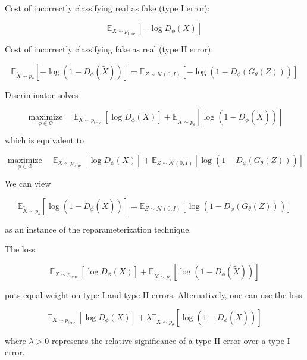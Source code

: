\begin{concept}
    Cost of incorrectly classifying real as fake (type I error):

    $$
    \mathbb{E}_{X \sim p_{\text {true }}}\left[-\log D_{\phi}(X)\right]
    $$

    Cost of incorrectly classifying fake as real (type II error):

    $$
    \mathbb{E}_{\tilde{X} \sim p_{\theta}}\left[-\log \left(1-D_{\phi}(\tilde{X})\right)\right]=\mathbb{E}_{Z \sim \mathcal{N}(0, I)}\left[-\log \left(1-D_{\phi}\left(G_{\theta}(Z)\right)\right)\right]
    $$

    \par\noindent\textcolor{gray}{\hdashrule{\textwidth}{0.4pt}{1pt 2pt}}

    Discriminator solves

    $$
    \underset{\phi \in \Phi}{\operatorname{maximize}} \quad \mathbb{E}_{X \sim p_{\text {true }}}\left[\log D_{\phi}(X)\right]+\mathbb{E}_{\tilde{X} \sim p_{\theta}}\left[\log \left(1-D_{\phi}(\tilde{X})\right)\right]
    $$

    which is equivalent to

    $$
    \underset{\phi \in \Phi}{\operatorname{maximize}} \quad \mathbb{E}_{X \sim p_{\text {true }}}\left[\log D_{\phi}(X)\right]+\mathbb{E}_{Z \sim \mathcal{N}(0, I)}\left[\log \left(1-D_{\phi}\left(G_{\theta}(Z)\right)\right)\right]
    $$

    We can view

    $$
    \mathbb{E}_{\tilde{X} \sim p_{\theta}}\left[\log \left(1-D_{\phi}(\tilde{X})\right)\right]=\mathbb{E}_{Z \sim \mathcal{N}(0, I)}\left[\log \left(1-D_{\phi}\left(G_{\theta}(Z)\right)\right)\right]
    $$

    as an instance of the reparameterization technique.

    \par\noindent\textcolor{gray}{\hdashrule{\textwidth}{0.4pt}{1pt 2pt}}

    The loss

    $$
    \mathbb{E}_{X \sim p_{\text {true }}}\left[\log D_{\phi}(X)\right]+\mathbb{E}_{\tilde{X} \sim p_{\theta}}\left[\log \left(1-D_{\phi}(\tilde{X})\right)\right]
    $$

    puts equal weight on type I and type II errors. Alternatively, one can use the loss

    $$
    \mathbb{E}_{X \sim p_{\text {true }}}\left[\log D_{\phi}(X)\right]+\lambda \mathbb{E}_{\tilde{X} \sim p_{\theta}}\left[\log \left(1-D_{\phi}(\tilde{X})\right)\right]
    $$

    where $\lambda>0$ represents the relative significance of a type II error over a type I error.
\end{concept}

